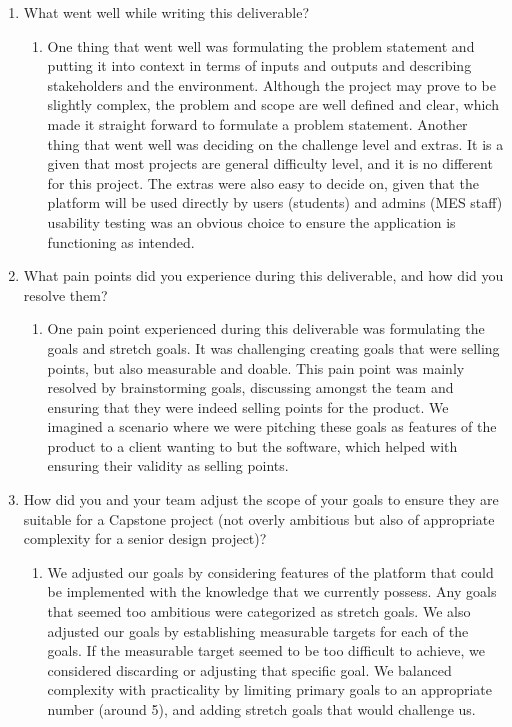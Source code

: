 \documentclass{article}
\begin{document}
\begin{enumerate}
    \item What went well while writing this deliverable? 
    \begin{enumerate}
        \item One thing that went well was formulating the problem statement and putting it into context in terms of inputs and outputs and describing stakeholders and the environment. Although the project may prove to be slightly complex, the problem and scope are well defined and clear, which made it straight forward to formulate a problem statement. Another thing that went well was deciding on the challenge level and extras. It is a given that most projects are general difficulty level, and it is no different for this project. The extras were also easy to decide on, given that the platform will be used directly by users (students) and admins (MES staff) usability testing was an obvious choice to ensure the application is functioning as intended.
    \end{enumerate}
    \item What pain points did you experience during this deliverable, and how
    did you resolve them?
    \begin{enumerate}
        \item One pain point experienced during this deliverable was formulating the goals and stretch goals. It was challenging creating goals that were selling points, but also measurable and doable. This pain point was mainly resolved by brainstorming goals, discussing amongst the team and ensuring that they were indeed selling points for the product. We imagined a scenario where we were pitching these goals as features of the product to a client wanting to but the software, which helped with ensuring their validity as selling points.
    \end{enumerate}
    \item How did you and your team adjust the scope of your goals to ensure
    they are suitable for a Capstone project (not overly ambitious but also of
    appropriate complexity for a senior design project)?
    \begin{enumerate}
        \item We adjusted our goals by considering features of the platform that could be implemented with the knowledge that we currently possess. Any goals that seemed too ambitious were categorized as stretch goals. We also adjusted our goals by establishing measurable targets for each of the goals. If the measurable target seemed to be too difficult to achieve, we considered discarding or adjusting that specific goal. We balanced complexity with practicality by limiting primary goals to an appropriate number (around 5), and adding stretch goals that would challenge us.
    \end{enumerate}
\end{enumerate}  
\end{document}
